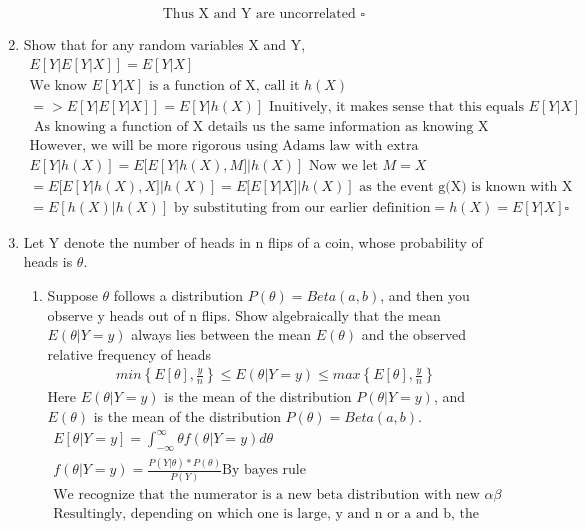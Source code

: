 \documentclass[11pt]{article}
\begin{document}
\begin{enumerate}
\begin{gather}
	\text{Thus X and Y are uncorrelated }\square
\end{gather}
\item Show that for any random variables X and Y,
\begin{gather}
	E[Y|E[Y|X]]=E[Y|X]\\
	\text{We know }E[Y|X] \text{ is a function of X, call it }h(X)\\
	=> E[Y|E[Y|X]]=E[Y|h(X)]\text{ Inuitively, it makes sense that this equals } E[Y|X]\\
	\text{ As knowing a function of X details us the same information as knowing X}\\
	\text{However, we will be more rigorous using Adams law with extra conditioning}\\
	E[Y|h(X)] = E[E[Y|h(X),M]|h(X)] \text{ Now we let } M=X\\
	= E[E[Y|h(X),X]|h(X)] = E[E[Y|X]|h(X)] \text{ as the event g(X) is known with X}\\
	= E[h(X)|h(X)] \text{ by substituting from our earlier definition}
	= h(X) = E[Y|X]\square	
\end{gather}
\item Let Y denote the number of heads in n flips of a coin, whose probability of heads is $\theta$.
\begin{enumerate}
	\item Suppose $\theta$ follows a distribution $P(\theta) = Beta(a, b)$, and then you observe y heads out of n flips.
	Show algebraically that the mean $E(\theta | Y = y)$ always lies between the mean $E(\theta)$ and the observed
	relative frequency of heads
	\begin{gather}
		min\left\{E[\theta],\frac{y}{n}\right\}\le E(\theta | Y = y) \le max\left\{E[\theta],\frac{y}{n}\right\}
	\end{gather}
	Here $E(\theta| Y = y)$ is the mean of the distribution $P(\theta | Y = y)$, and $E(\theta)$ is the mean of the distribution
		$P(\theta) = Beta(a, b)$.
	\begin{gather}
		E[\theta|Y=y] = \int_{-\infty}^{\infty} \theta f(\theta|Y=y) d\theta\\
		f(\theta|Y=y)=\frac{P(Y|\theta) * P(\theta)}{P(Y)} \text{By bayes rule}\\
		\text{We recognize that the numerator is a new beta distribution with new } \alpha \beta\\
		\text{Resultingly, depending on which one is large, y and n or a and b, the exepected alue will lie between them?}
	\end{gather}

\end{enumerate}
\end{enumerate}
\end{document}
